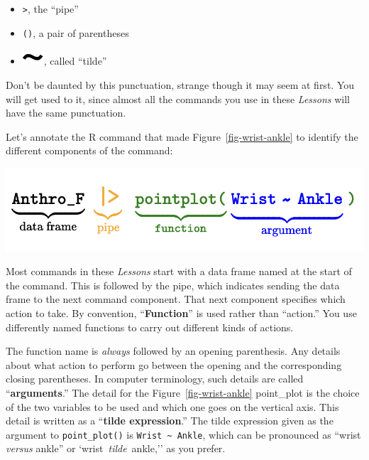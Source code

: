 \documentclass[
  letterpaper,
  DIV=11,
  numbers=noendperiod,
  oneside]{scrartcl}
\providecommand{\tightlist}{%
  \setlength{\itemsep}{0pt}\setlength{\parskip}{0pt}}\usepackage{longtable,booktabs,array}
\begin{document}
\begin{itemize}
\tightlist
\item
  \texttt{\textbar{}\textgreater{}}, the ``pipe''
\item
  \texttt{()}, a pair of parentheses
\item
  \includegraphics{www/tilde.png}, called ``tilde''
\end{itemize}

Don't be daunted by this punctuation, strange though it may seem at
first. You will get used to it, since almost all the commands you use in
these \emph{Lessons} will have the same punctuation.

Let's annotate the R command that made Figure~\ref{fig-wrist-ankle} to
identify the different components of the command:

\includegraphics{www/latex-image-point-plot.png}

Most commands in these \emph{Lessons} start with a data frame named at
the start of the command. This is followed by the pipe, which indicates
sending the data frame to the next command component. That next
component specifies which action to take. By convention,
``\textbf{Function}'' is used rather than ``action.'' You use
differently named functions to carry out different kinds of actions.
{}

The function name is \emph{always} followed by an opening parenthesis.
Any details about what action to perform go between the opening and the
corresponding closing parentheses. In computer terminology, such details
are called ``\textbf{arguments}.'' The detail for the
Figure~\ref{fig-wrist-ankle} point\_plot is the choice of the two
variables to be used and which one goes on the vertical axis. This
detail is written as a ``\textbf{tilde expression}.'' The tilde
expression given as the argument to \texttt{point\_plot()} is
\texttt{Wrist\ \textasciitilde{}\ Ankle}, which can be pronounced as
``wrist \emph{versus} ankle'' or `wrist~\emph{tilde}~ankle,'' as you
prefer.
\end{document}

